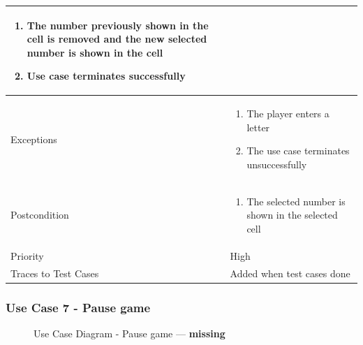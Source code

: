 \documentclass[12pt]{article}
\begin{document}
\begin{center}
\begin{tabular}{ |p{3cm}|p{10cm}| }
\begin{enumerate}
        \item The number previously shown in the cell is removed and the new selected number is shown in the cell
        \item Use case terminates successfully
    \end{enumerate}  \\
    \hline
    Exceptions & 
    \begin{enumerate}
        \item The player enters a letter
        \item The use case terminates unsuccessfully
    \end{enumerate}  \\
    \hline
    Postcondition & 
    \vspace*{-0.2in}
    \begin{enumerate}
        \item The selected number is shown in the selected cell
    \end{enumerate}  \\
    \hline
    Priority & High  \\
    \hline
    Traces to Test Cases & Added when test cases done  \\
    \hline
\end{tabular}
\end{center}

\newpage


\subsubsection{Use Case 7 - Pause game} \label{uc:7}

\begin{figure}[htbp]
    \centering
    \caption{Use Case Diagram - Pause game --- \textbf{missing}}
\end{figure}
\end{document}
